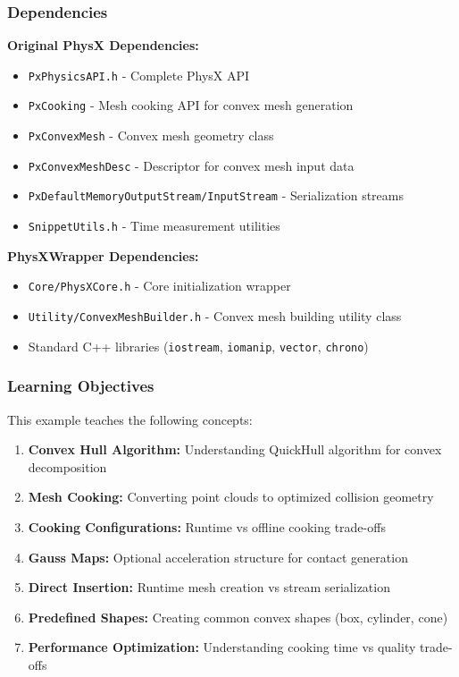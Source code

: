 \subsubsection{Dependencies}

\textbf{Original PhysX Dependencies:}
\begin{itemize}
    \item \texttt{PxPhysicsAPI.h} - Complete PhysX API
    \item \texttt{PxCooking} - Mesh cooking API for convex mesh generation
    \item \texttt{PxConvexMesh} - Convex mesh geometry class
    \item \texttt{PxConvexMeshDesc} - Descriptor for convex mesh input data
    \item \texttt{PxDefaultMemoryOutputStream/InputStream} - Serialization streams
    \item \texttt{SnippetUtils.h} - Time measurement utilities
\end{itemize}

\textbf{PhysXWrapper Dependencies:}
\begin{itemize}
    \item \texttt{Core/PhysXCore.h} - Core initialization wrapper
    \item \texttt{Utility/ConvexMeshBuilder.h} - Convex mesh building utility class
    \item Standard C++ libraries (\texttt{iostream}, \texttt{iomanip}, \texttt{vector}, \texttt{chrono})
\end{itemize}

\subsubsection{Learning Objectives}

This example teaches the following concepts:
\begin{enumerate}
    \item \textbf{Convex Hull Algorithm:} Understanding QuickHull algorithm for convex decomposition
    \item \textbf{Mesh Cooking:} Converting point clouds to optimized collision geometry
    \item \textbf{Cooking Configurations:} Runtime vs offline cooking trade-offs
    \item \textbf{Gauss Maps:} Optional acceleration structure for contact generation
    \item \textbf{Direct Insertion:} Runtime mesh creation vs stream serialization
    \item \textbf{Predefined Shapes:} Creating common convex shapes (box, cylinder, cone)
    \item \textbf{Performance Optimization:} Understanding cooking time vs quality trade-offs
\end{enumerate}

